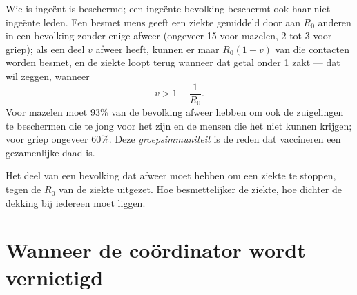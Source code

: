 \begin{proposition}\label{prop:g12:adaptive-immunity:herd}
Wie is ingeënt is beschermd; een ingeënte bevolking beschermt ook haar
niet-ingeënte leden. Een besmet mens geeft een ziekte gemiddeld door aan
$R_0$ anderen in een bevolking zonder enige afweer (ongeveer 15 voor
mazelen, 2 tot 3 voor griep); als een deel $v$ afweer heeft, kunnen er
maar $R_0(1 - v)$ van die contacten worden besmet, en de ziekte loopt
terug wanneer dat getal onder 1 zakt --- dat wil zeggen, wanneer
\[
v > 1 - \frac{1}{R_0}.
\]
Voor mazelen moet 93\% van de bevolking afweer hebben om ook de zuigelingen
te beschermen die te jong voor het  zijn en de mensen die het niet
kunnen krijgen; voor griep ongeveer 60\%. Deze
\emph{groepsimmuniteit} is de reden dat vaccineren
een gezamenlijke daad is.
\end{proposition}
\admitted

\begin{omfigure}

{\small Het deel van een bevolking dat afweer moet hebben om een ziekte
te stoppen, tegen de $R_0$ van de ziekte uitgezet. Hoe besmettelijker de
ziekte, hoe dichter de dekking bij iedereen moet liggen.}
\end{omfigure}

\section{Wanneer de coördinator wordt vernietigd}

